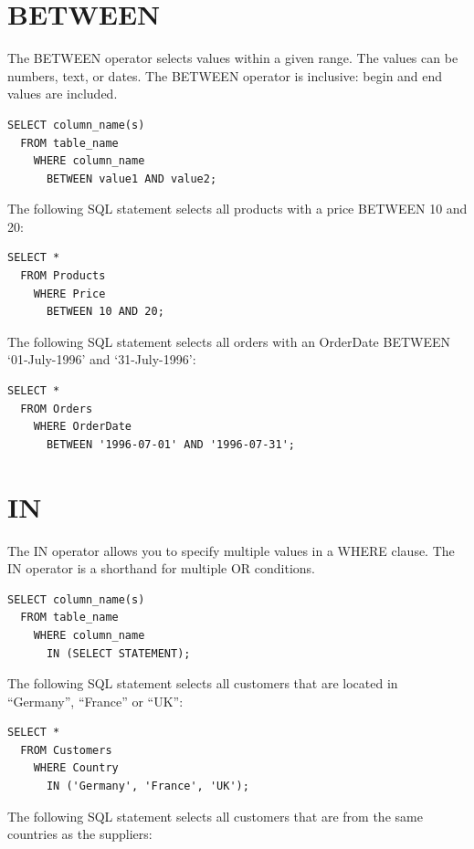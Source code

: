 \documentclass[
]{book}
\begin{document}
\hypertarget{between}{%
\section{BETWEEN}\label{between}}

The BETWEEN operator selects values within a given range. The values can be numbers, text, or dates. The BETWEEN operator is inclusive: begin and end values are included.

\begin{verbatim}
SELECT column_name(s)
  FROM table_name
    WHERE column_name 
      BETWEEN value1 AND value2;
\end{verbatim}

The following SQL statement selects all products with a price BETWEEN 10 and 20:

\begin{verbatim}
SELECT * 
  FROM Products
    WHERE Price 
      BETWEEN 10 AND 20;
\end{verbatim}

The following SQL statement selects all orders with an OrderDate BETWEEN `01-July-1996' and `31-July-1996':

\begin{verbatim}
SELECT * 
  FROM Orders
    WHERE OrderDate 
      BETWEEN '1996-07-01' AND '1996-07-31';
\end{verbatim}

\hypertarget{in}{%
\section{IN}\label{in}}

The IN operator allows you to specify multiple values in a WHERE clause. The IN operator is a shorthand for multiple OR conditions.

\begin{verbatim}
SELECT column_name(s)
  FROM table_name
    WHERE column_name 
      IN (SELECT STATEMENT);
\end{verbatim}

The following SQL statement selects all customers that are located in ``Germany'', ``France'' or ``UK'':

\begin{verbatim}
SELECT * 
  FROM Customers
    WHERE Country 
      IN ('Germany', 'France', 'UK');
\end{verbatim}

The following SQL statement selects all customers that are from the same countries as the suppliers:
\end{document}
